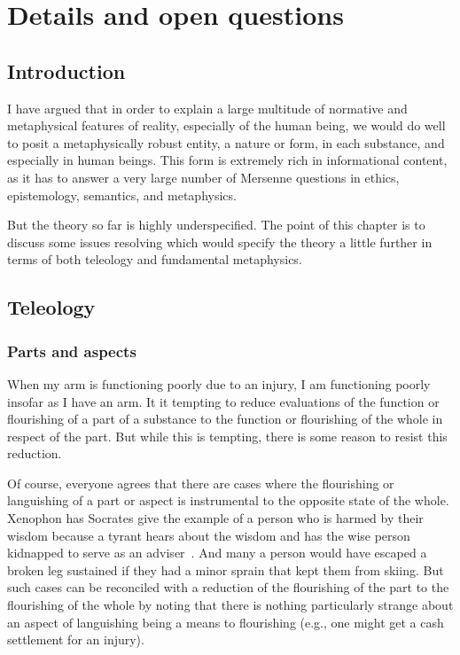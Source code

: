 \def\mychapter{X}


\chapter{Details and open questions}\label{ch:details}
\section{Introduction}
I have argued that in order to explain a large multitude of normative and metaphysical features 
of reality, especially of the human being, we would do well to posit a metaphysically robust 
entity, a nature or form, in each substance, and especially in human beings. This form is extremely rich 
in informational content, 
as it has to answer a very large number of Mersenne questions in ethics, epistemology, semantics,
and metaphysics.

But the theory so far is highly underspecified. The point of this chapter is to discuss some issues
resolving which would specify the theory a little further in terms of both teleology and fundamental metaphysics. 

\section{Teleology}
\subsection{Parts and aspects}
When my arm is functioning poorly due to an injury, I am functioning poorly insofar
as I have an arm. It it tempting to reduce evaluations of the function or flourishing
of a part of a substance to the function or flourishing of the whole in respect of the
part. But while this is tempting, there is some reason to resist this reduction.

Of course, everyone agrees that there are cases where the flourishing or languishing of a part or aspect is
instrumental to the opposite state of the whole. Xenophon has Socrates give the example of a 
person who is harmed by their wisdom because a tyrant hears about the wisdom and has the
wise person kidnapped to serve as an adviser~\parencite[\textit{Memorabilia} IV.2]{Xenophon}. And many a person would have escaped a broken
leg sustained if they had a minor sprain that kept them from skiing. But such cases can be
reconciled with a reduction of the flourishing of the part to the flourishing of the whole by
noting that there is nothing particularly strange about an aspect of languishing being a means to 
flourishing (e.g., one might get a cash settlement for an injury). 

